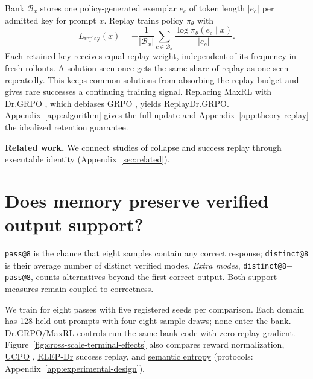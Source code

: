 Bank $\mathcal B_x$ stores one policy-generated exemplar $e_c$ of token length
$|e_c|$ per admitted key for prompt $x$. Replay trains policy $\pi_\theta$ with
\begin{equation}
L_{\mathrm{replay}}(x)=-\frac{1}{|\mathcal B_x|}
\sum_{c\in\mathcal B_x}\frac{\log\pi_\theta(e_c\mid x)}{|e_c|}.
\label{eq:lm-verified-replay}
\end{equation}
Each retained key receives equal replay weight, independent of its frequency in
fresh rollouts. A solution seen once gets the same share of replay as one seen
repeatedly. This keeps common solutions from absorbing the replay budget and
gives rare successes a continuing training signal.
Replacing MaxRL with Dr.GRPO \citep{liu2025understanding},
which debiases GRPO \citep{shao2024deepseekmath}, yields ReplayDr.GRPO.
Appendix~\ref{app:algorithm} gives the full update and
Appendix~\ref{app:theory-replay} the idealized retention guarantee.

\noindent\textbf{Related work.} We connect studies of collapse
\citep{cui2025entropy,dang2025diversity} and success replay \citep{zhang2025rlep}
through executable identity (Appendix~\ref{sec:related}).

\section{Does memory preserve verified output support?}
\label{sec:experiments}\label{sec:results}
\texttt{pass@8} is the chance that eight samples contain any correct response;
\texttt{distinct@8} is their average number of distinct verified modes.
\emph{Extra modes}, \texttt{distinct@8}$-$\texttt{pass@8}, counts alternatives
beyond the first correct output. Both support measures remain coupled to correctness.

We train for eight passes with five registered seeds per comparison. Each domain
has 128 held-out prompts with four eight-sample draws; none enter the bank.
Dr.GRPO/MaxRL controls run the same bank code with zero replay gradient.
Figure~\ref{fig:cross-scale-terminal-effects} also compares reward normalization,
\href{https://huggingface.co/od2961/maxent-grpo-models/blob/main/EXPERIMENTS.md\#direct-comparators}{UCPO} \citep{lochab2026ucpo}, \href{https://huggingface.co/od2961/maxent-grpo-models/blob/main/EXPERIMENTS.md\#direct-comparators}{RLEP-Dr} success replay, and \href{https://huggingface.co/od2961/maxent-grpo-models/blob/main/EXPERIMENTS.md\#semantic-ablations}{semantic entropy}
(protocols: Appendix~\ref{app:experimental-design}).

